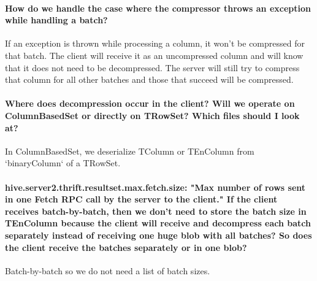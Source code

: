 \documentclass[11pt,a4paper]{article}
\begin{document}
	\paragraph{How do we handle the case where the compressor throws an exception while handling a batch?}
	If an exception is thrown while processing a column, it won't be compressed for that batch. The client will receive it as an uncompressed column and will know that it does not need to be decompressed. The server will still try to compress that column for all other batches and those that succeed will be compressed.
	
	\paragraph{Where does decompression occur in the client? Will we operate on ColumnBasedSet or directly on TRowSet? Which files should I look at?}
	In ColumnBasedSet, we deserialize TColumn or TEnColumn from `binaryColumn` of a TRowSet.
	
	\paragraph{hive.server2.thrift.resultset.max.fetch.size: "Max number of rows sent in one Fetch RPC call by the server to the client." If the client receives batch-by-batch, then we don't need to store the batch size in TEnColumn because the client will receive and decompress each batch separately instead of receiving one huge blob with all batches? So does the client receive the batches separately or in one blob?}
	Batch-by-batch so we do not need a list of batch sizes.
\end{document}
